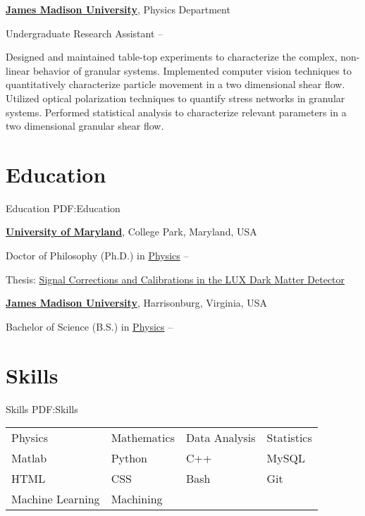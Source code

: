 \documentclass[letterpaper,MMMyyyy,nonstop]{simpleresumecv}
\begin{document}
\begin{body}
\BigGap
\href{http://csma31.csm.jmu.edu/physics/}
{\textbf{James Madison University}},
Physics Department

\GapNoBreak
\BulletItem
Undergraduate Research Assistant
\hfill
{} --
\begin{detail}
\SubBulletItem
Designed and maintained table-top experiments to characterize the complex, non-linear behavior of granular systems.
\SubBulletItem
Implemented computer vision techniques to quantitatively characterize particle movement in a two dimensional shear flow.
\SubBulletItem
Utilized optical polarization techniques to quantify stress networks in granular systems.
\SubBulletItem
Performed statistical analysis to characterize relevant parameters in a two dimensional granular shear flow.
\end{detail}


\section
{Education}
{Education}
{PDF:Education}

\href{http://umd.edu/}
{\textbf{University of Maryland}},
College Park, Maryland, USA

\GapNoBreak
\BulletItem
Doctor of Philosophy (Ph.D.) in
\href{http://umdphysics.umd.edu/}
{Physics}
\hfill
{}--
\begin{detail}
\SubBulletItem
Thesis:
\href{http://updatethis}
{Signal Corrections and Calibrations in the LUX Dark Matter Detector}
\end{detail}


\BigGap
\href{http://www.jmu.edu/}
{\textbf{James Madison University}},
Harrisonburg, Virginia, USA

\GapNoBreak
\BulletItem
Bachelor of Science (B.S.) in
\href{http://csma31.csm.jmu.edu/physics/}
{Physics}
\hfill
{} --


\section
{Skills}
{Skills}
{PDF:Skills}

\Gap
\begin{tabular}{llll}
Physics & Mathematics & Data Analysis & Statistics\\
Matlab & Python & C++ & MySQL\\
HTML & CSS & Bash & Git \\
Machine Learning & Machining
\end{tabular}


\end{body}
\end{document}
